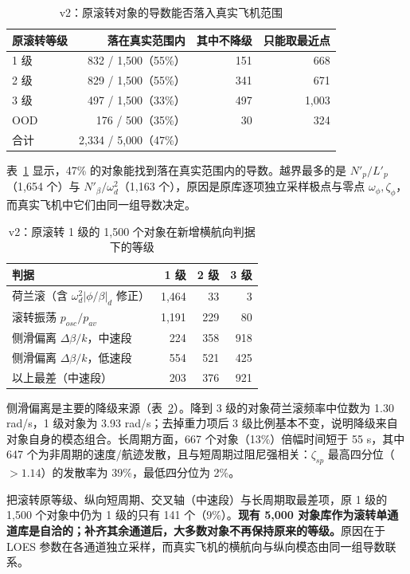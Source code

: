 \documentclass[UTF8,a4paper,11pt,fontset=fandol,scheme=plain]{ctexart}
\begin{document}
\begin{table}[H]
\centering\small
\caption{v2：原滚转对象的导数能否落入真实飞机范围}\label{tab:v2real}
\begin{tabular}{@{}lrrr@{}}
\toprule
原滚转等级 & 落在真实范围内 & 其中不降级 & 只能取最近点 \\
\midrule
1 级 & 832 / 1,500（55\%） & 151 & 668 \\
2 级 & 829 / 1,500（55\%） & 341 & 671 \\
3 级 & 497 / 1,500（33\%） & 497 & 1,003 \\
OOD & 176 / 500（35\%） & 30 & 324 \\
\midrule
合计 & 2,334 / 5,000（47\%） & & \\
\bottomrule
\end{tabular}
\end{table}

表~\ref{tab:v2real} 显示，47\% 的对象能找到落在真实范围内的导数。越界最多的是 \(N'_p/L'_p\)（1,654 个）与 \(N'_\beta/\omega_d^2\)（1,163 个），原因是原库逐项独立采样极点与零点 \(\omega_\phi,\zeta_\phi\)，而真实飞机中它们由同一组导数决定。

\begin{table}[H]
\centering\small
\caption{v2：原滚转 1 级的 1,500 个对象在新增横航向判据下的等级}\label{tab:v2cross}
\begin{tabular}{@{}lrrr@{}}
\toprule
判据 & 1 级 & 2 级 & 3 级 \\
\midrule
荷兰滚（含 \(\omega_d^2|\phi/\beta|_d\) 修正） & 1,464 & 33 & 3 \\
滚转振荡 \(p_{osc}/p_{av}\) & 1,191 & 229 & 80 \\
侧滑偏离 \(\Delta\beta/k\)，中速段 & 224 & 358 & 918 \\
侧滑偏离 \(\Delta\beta/k\)，低速段 & 554 & 521 & 425 \\
以上最差（中速段） & 203 & 376 & 921 \\
\bottomrule
\end{tabular}
\end{table}

侧滑偏离是主要的降级来源（表~\ref{tab:v2cross}）。降到 3 级的对象荷兰滚频率中位数为 1.30 rad/s，1 级对象为 3.93 rad/s；去掉重力项后 3 级比例基本不变，说明降级来自对象自身的模态组合。长周期方面，667 个对象（13\%）倍幅时间短于 55 s，其中 647 个为非周期的速度/航迹发散，且与短周期过阻尼强相关：\(\zeta_{sp}\) 最高四分位（\(>1.14\)）的发散率为 39\%，最低四分位为 2\%。

把滚转原等级、纵向短周期、交叉轴（中速段）与长周期取最差项，原 1 级的 1,500 个对象中仍为 1 级的只有 141 个（9\%）。\textbf{现有 5,000 对象库作为滚转单通道库是自洽的；补齐其余通道后，大多数对象不再保持原来的等级。}原因在于 LOES 参数在各通道独立采样，而真实飞机的横航向与纵向模态由同一组导数联系。
\end{document}
